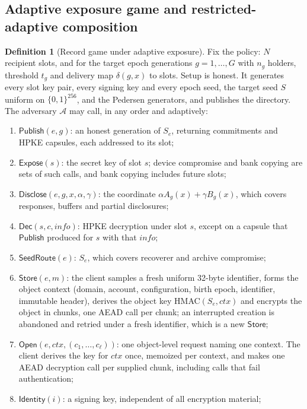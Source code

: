 \documentclass[pdflatex,sn-mathphys-num,twocolumn]{sn-jnl}
\theoremstyle{plain}
\theoremstyle{definition}
\newtheorem{definition}[theorem]{Definition}
\begin{document}
\subsection{Adaptive exposure game and restricted-adaptive composition}\label{sec:adaptive}
\begin{definition}[Record game under adaptive exposure]\label{def:adaptivegame}
Fix the policy: $N$ recipient slots, and for the target epoch generations $g=1,\dots,G$ with $n_g$ holders, threshold $t_g$ and delivery map $\delta(g,x)$ to slots. Setup is honest. It generates every slot key pair, every signing key and every epoch seed, the target seed $S$ uniform on $\{0,1\}^{256}$, and the Pedersen generators, and publishes the directory. The adversary $\mathcal A$ may call, in any order and adaptively:
\begin{enumerate}
\item $\mathsf{Publish}(e,g)$: an honest generation of $S_e$, returning commitments and HPKE capsules, each addressed to its slot;
\item $\mathsf{Expose}(s)$: the secret key of slot $s$; device compromise and bank copying are sets of such calls, and bank copying includes future slots;
\item $\mathsf{Disclose}(e,g,x,\alpha,\gamma)$: the coordinate $\alpha A_g(x)+\gamma B_g(x)$, which covers responses, buffers and partial disclosures;
\item $\mathsf{Dec}(s,c,\mathit{info})$: HPKE decryption under slot $s$, except on a capsule that $\mathsf{Publish}$ produced for $s$ with that $\mathit{info}$;
\item $\mathsf{SeedRoute}(e)$: $S_e$, which covers recoverer and archive compromise;
\item $\mathsf{Store}(e,m)$: the client samples a fresh uniform 32-byte identifier, forms the object context (domain, account, configuration, birth epoch, identifier, immutable header), derives the object key HMAC$(S_e,\mathit{ctx})$ and encrypts the object in chunks, one AEAD call per chunk; an interrupted creation is abandoned and retried under a fresh identifier, which is a new $\mathsf{Store}$;
\item $\mathsf{Open}(e,\mathit{ctx},(c_1,\dots,c_\ell))$: one object-level request naming one context. The client derives the key for $\mathit{ctx}$ once, memoized per context, and makes one AEAD decryption call per supplied chunk, including calls that fail authentication;
\item $\mathsf{Identity}(i)$: a signing key, independent of all encryption material;

\end{enumerate}
\end{definition}
\end{document}
